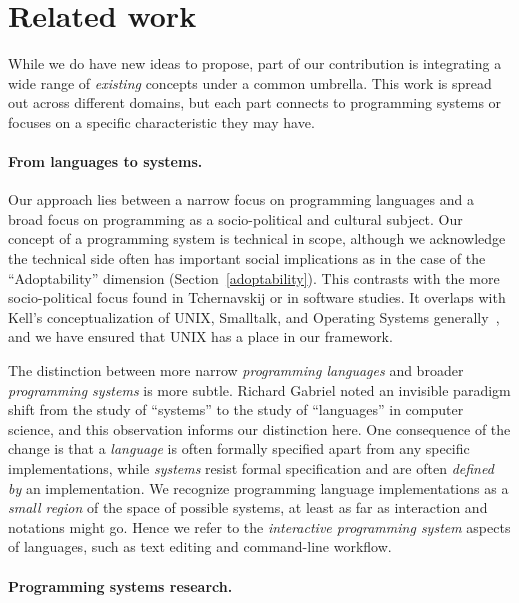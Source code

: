 \documentclass[english,submission]{programming}
\providecommand{\DIFadd}[1]{{\protect\color{blue}\uwave{#1}}} %
\providecommand{\DIFaddbegin}{} %
\providecommand{\DIFaddend}{} %
\begin{document}
\hypertarget{related-work}{%
\section{Related work}\label{related-work}}

While we do have new ideas to propose, part of our contribution is
integrating a wide range of \emph{existing} concepts under a common
umbrella. This work is spread out across different domains, but each
part connects to programming systems or focuses on a specific
characteristic they may have.

\paragraph{From languages to systems.}

Our approach lies between a narrow focus on programming languages and a
broad focus on programming as a socio-political and cultural subject.
Our concept of a programming system is technical in scope, although we
acknowledge the technical side often has important social implications
as in the case of the ``Adoptability'' dimension
(Section~\ref{adoptability}). This contrasts with the more
socio-political focus found in Tchernavskij\DIFaddbegin \DIFadd{~}\DIFaddend \cite{TcherDiss} or in
software studies\DIFaddbegin \DIFadd{~}\DIFaddend \cite{SwStudies}. It overlaps with Kell's
conceptualization of UNIX, Smalltalk, and Operating Systems
generally~\cite{KellOS}, and we have ensured that UNIX has a place in
our framework.

The distinction between more narrow \emph{programming languages} and
broader \emph{programming systems} is more subtle. Richard Gabriel noted
an invisible paradigm shift from the study of ``systems'' to the study
of ``languages'' in computer science\DIFaddbegin \DIFadd{~}\DIFaddend \cite{PLrev}, and this observation
informs our distinction here. One consequence of the change is that a
\emph{language} is often formally specified apart from any specific
implementations, while \emph{systems} resist formal specification and
are often \emph{defined by} an implementation. We recognize programming
language implementations as a \emph{small region} of the space of
possible systems, at least as far as interaction and notations might go.
Hence we refer to the \emph{interactive programming system} aspects of
languages, such as text editing and command-line workflow.

\paragraph{Programming systems research.}
\end{document}
